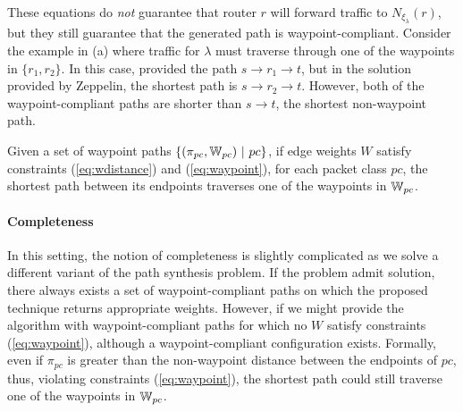 These equations do \emph{not} guarantee that
router $r$ will forward traffic to  
$N_{\xi_\lambda}(r)$, but they still guarantee that the generated path is  waypoint-compliant. 
Consider the example in (a) where traffic for
$\lambda$ must traverse through one of the waypoints in $\{r_1, r_2\}$. 
In this case,  \genesis provided the path $s \rightarrow 
r_1 \rightarrow t$, but in the solution provided by Zeppelin, 
the shortest path is $s \rightarrow r_2
\rightarrow t$.
However, both of the waypoint-compliant paths are shorter 
than $s \rightarrow t$, the shortest non-waypoint path.

\begin{theorem} \label{thm:waypoint}
	Given a set of waypoint paths $\{(\pi_{pc}, \mathbb{W}_{pc}) ~|~ pc\}$, if edge weights 
	$W$ satisfy constraints (\ref{eq:wdistance}) and (\ref{eq:waypoint}), for
	each packet class $pc$, the shortest path between its endpoints
	traverses one of the waypoints in $\mathbb{W}_{pc}$.
\end{theorem}
\iffull

\fi
\paragraph{Completeness}
In this setting, the notion of completeness is slightly complicated as
we solve a different variant of the path synthesis problem.
If the problem admit solution, there always exists a set of waypoint-compliant
paths on which the proposed technique returns appropriate weights.
However, if we might provide the algorithm with waypoint-compliant paths
for which no $W$ satisfy constraints (\ref{eq:waypoint}), although a waypoint-compliant
configuration exists. 
Formally, even if $\pi_{pc}$ is greater than the non-waypoint distance between the endpoints of $pc$, thus,
violating constraints (\ref{eq:waypoint}), the shortest path could still traverse one of the waypoints in $\mathbb{W}_{pc}$.

